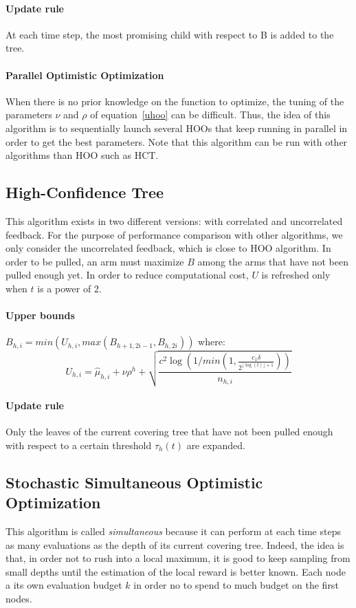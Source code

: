 \documentclass[a4paper,10pt]{article}
\begin{document}
\paragraph{Update rule} At each time step, the most promising child with respect to B is added to the tree.

\paragraph{Parallel Optimistic Optimization}
When there is no prior knowledge on the function to optimize, the tuning of the parameters $\nu$ and $\rho$ of equation~\ref{uhoo} can be difficult. Thus, the idea of this algorithm is to sequentially launch several HOOs that keep running in parallel in order to get the best parameters. Note that this algorithm can be run with other algorithms than HOO such as HCT.

\subsection{High-Confidence Tree}
This algorithm exists in two different versions: with correlated and uncorrelated feedback. For the purpose of performance comparison with other algorithms, we only consider the uncorrelated feedback, which is close to HOO algorithm. In order to be pulled, an arm must maximize $B$ among the arms that have not been pulled enough yet. In order to reduce computational cost, $U$ is refreshed only when $t$ is a power of 2.
\paragraph{Upper bounds} $B_{h,i}=min(U_{h,i},max(B_{h+1,2i-1},B_{h,2i}))$ where:
\begin{equation}
\label{uhct}
U_{h,i}=\widehat{\mu}_{h,i}+\nu \rho^h+\sqrt{\dfrac{c^2\log(1/min(1,\frac{c_1\delta}{2^{\lfloor \log(t) \rfloor + 1}}))}{n_{h,i}}}
\end{equation}
\paragraph{Update rule} Only the leaves of the current covering tree that have not been pulled enough with respect to a certain threshold $\tau_h(t)$ are expanded.

\subsection{Stochastic Simultaneous Optimistic Optimization}
This algorithm is called \textit{simultaneous} because it can perform at each time steps as many evaluations as the depth of its current covering tree. Indeed, the idea is that, in order not to rush into a local maximum, it is good to keep sampling from small depths until the estimation of the local reward is better known. Each node a its own evaluation budget $k$ in order no to spend to much budget on the first nodes.
\end{document}
